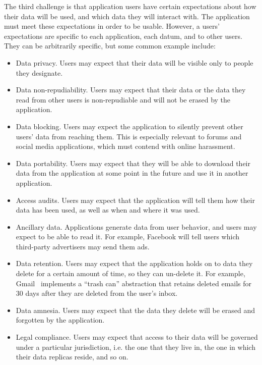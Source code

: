 The third challenge is that application users have
certain expectations about how their data will be used, and which data
they will interact with.  The application must
meet these expectations in order to be usable.  However, a users' expectations are
specific to each application, each datum, and to other users.  They can be
arbitrarily specific, but some common example include:

\begin{itemize}
   \item Data privacy.  Users may expect that their data will be visible only to
      people they designate.
   \item Data non-repudiability.  Users may expect that their
      data or the data they read from other users is non-repudiable and will not
      be erased by the application.
   \item Data blocking.  Users may expect the application to silently prevent
      other users' data from reaching them.  This is especially relevant to
      forums and social media applications, which must contend with online
      harassment.
   \item Data portability.  Users may expect that they will be able to download
      their data from the application at some point in the future and use it in
      another application.
   \item Access audits.  Users may expect that the application will tell them
      how their data has been used, as well as when and where it was used.
   \item Ancillary data.  Applications generate data from user behavior, and
      users may expect to be able to read it.  For example, Facebook will tell
      users which third-party advertisers may send them ads.
   \item Data retention.  Users may expect that the application holds on to data
      they delete for a certain amount of time, so they can un-delete it.  For
      example, Gmail~\cite{gmail} implements a ``trash can'' abstraction that retains
      deleted emails for 30 days after they are deleted from the user's inbox.
   \item Data amnesia.  Users may expect that the data they delete will be
      erased and forgotten by the application.
   \item Legal compliance.  Users may expect that access to their data will be
      governed under a particular jurisdiction, i.e. the one that they live in,
      the one in which their data replicas reside, and so on.
\end{itemize}

